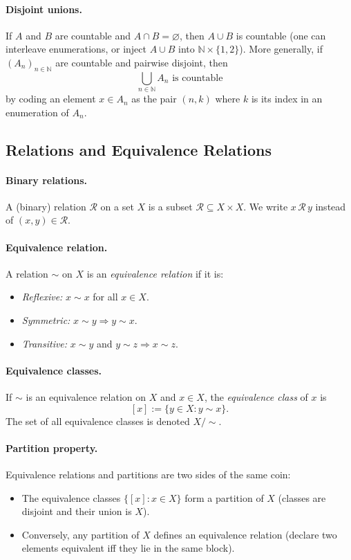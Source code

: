 \documentclass[12pt]{article}
\begin{document}
\paragraph{Disjoint unions.}
If $A$ and $B$ are countable and $A\cap B=\varnothing$, then $A\cup B$ is countable (one can interleave enumerations, or inject $A\cup B$ into $\mathbb{N}\times\{1,2\}$).
More generally, if $(A_n)_{n\in\mathbb{N}}$ are countable and pairwise disjoint, then
\[
\bigcup_{n\in\mathbb{N}} A_n\text{ is countable}
\]
by coding an element $x\in A_n$ as the pair $(n,k)$ where $k$ is its index in an enumeration of $A_n$.

\subsection*{Relations and Equivalence Relations}

\paragraph{Binary relations.}
A (binary) relation $\mathcal{R}$ on a set $X$ is a subset $\mathcal{R}\subseteq X\times X$. We write $x\,\mathcal{R}\,y$ instead of $(x,y)\in\mathcal{R}$.

\paragraph{Equivalence relation.}
A relation $\sim$ on $X$ is an \emph{equivalence relation} if it is:
\begin{itemize}
  \item \emph{Reflexive:} $x\sim x$ for all $x\in X$.
  \item \emph{Symmetric:} $x\sim y \Rightarrow y\sim x$.
  \item \emph{Transitive:} $x\sim y$ and $y\sim z \Rightarrow x\sim z$.
\end{itemize}

\paragraph{Equivalence classes.}
If $\sim$ is an equivalence relation on $X$ and $x\in X$, the \emph{equivalence class} of $x$ is
\[
[x] := \{y\in X : y\sim x\}.
\]
The set of all equivalence classes is denoted $X/\!\sim$.

\paragraph{Partition property.}
Equivalence relations and partitions are two sides of the same coin:
\begin{itemize}
  \item The equivalence classes $\{[x]:x\in X\}$ form a partition of $X$ (classes are disjoint and their union is $X$).
  \item Conversely, any partition of $X$ defines an equivalence relation (declare two elements equivalent iff they lie in the same block).
\end{itemize}
\end{document}

